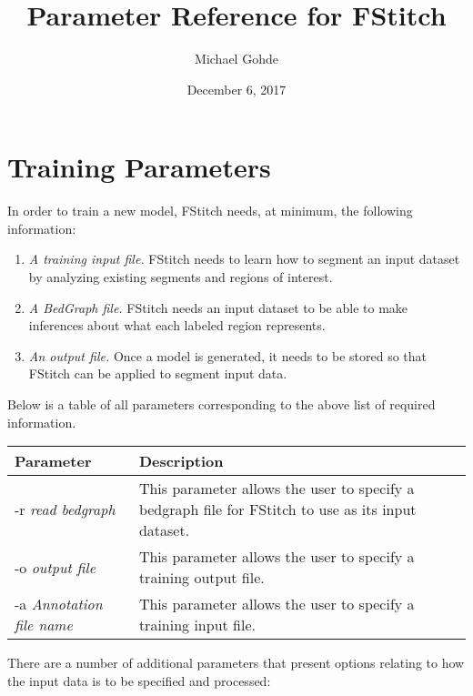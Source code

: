 \documentclass[12pt,letterpaper]{article}
\begin{document}
\title{Parameter Reference for FStitch}
\author{Michael Gohde}
\date{December 6, 2017}
\maketitle


\section{Training Parameters}

In order to train a new model, FStitch needs, at minimum, the following information:
\begin{enumerate}
 \item \textit{A training input file.} FStitch needs to learn how to segment an input dataset by analyzing existing segments and regions of interest.
 \item \textit{A BedGraph file.} FStitch needs an input dataset to be able to make inferences about what each labeled region represents.
 \item \textit{An output file.} Once a model is generated, it needs to be stored so that FStitch can be applied to segment input data.
\end{enumerate}

Below is a table of all parameters corresponding to the above list of required information. 

\begin{tabular}{| l | p{8cm} |}
 \hline
 \textbf{Parameter} & \textbf{Description}\\
 \hline
 -r \textit{read bedgraph} & This parameter allows the user to specify a bedgraph file for FStitch to use as its input dataset.\\
 \hline
 -o \textit{output file} & This parameter allows the user to specify a training output file.\\
 \hline
 -a \textit{Annotation file name} & This parameter allows the user to specify a training input file.\\
 \hline
\end{tabular}

There are a number of additional parameters that present options relating to how the input data is to be specified and processed:
\end{document}
